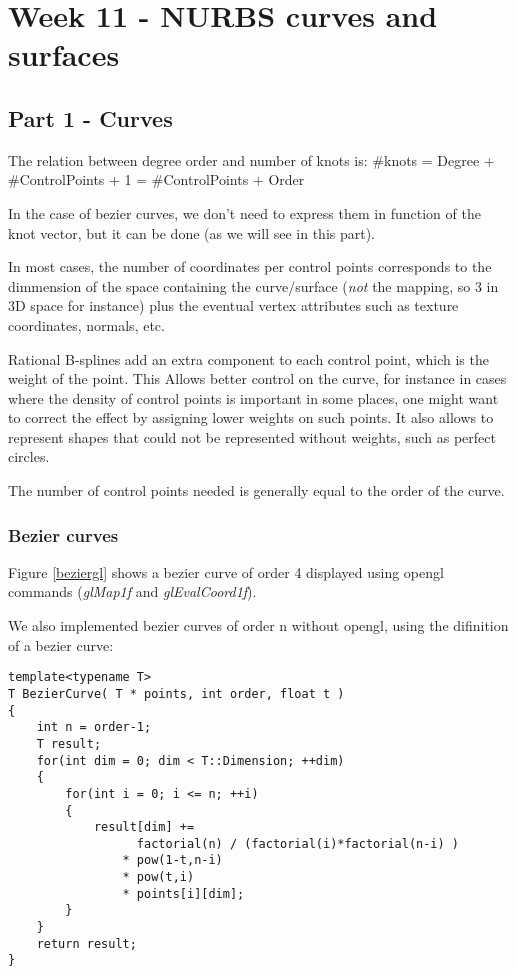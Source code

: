 \chapter{Week 11 - NURBS curves and surfaces}

\section{Part 1 - Curves}

The relation between degree order and number of knots is:
#knots = Degree + #ControlPoints + 1 = #ControlPoints + Order

In the case of bezier curves, we don't need to express them in function of the knot
vector, but it can be done (as we will see in this part).

In most cases, the number of coordinates per control points corresponds to the dimmension
of the space containing the curve/surface (\textit{not} the mapping, so 3 in 3D space for instance)
plus the eventual vertex attributes such as texture coordinates, normals, etc.

Rational B-splines add an extra component to each control point, which is the weight
of the point. This Allows better control on the curve, for instance in cases where
the density of control points is important in some places, one might want to correct
the effect by assigning lower weights on such points. It also allows to represent
shapes that could not be represented without weights, such as perfect circles.

The number of control points needed is generally equal to the order of the curve.

\subsection{Bezier curves}

Figure \ref{beziergl} shows a bezier curve of order 4 displayed using opengl
commands (\textit{glMap1f} and \textit{glEvalCoord1f}).

We also implemented bezier curves of order n without opengl, using the difinition
of a bezier curve:
\begin{lstlisting}[caption=Generic bezier curve]
template<typename T>
T BezierCurve( T * points, int order, float t )
{
    int n = order-1;
    T result;
    for(int dim = 0; dim < T::Dimension; ++dim)
    {
        for(int i = 0; i <= n; ++i)
        {
            result[dim] += 
                  factorial(n) / (factorial(i)*factorial(n-i) )
                * pow(1-t,n-i)
                * pow(t,i)
                * points[i][dim];
        }
    }
    return result;
} 
\end{lstlisting}

